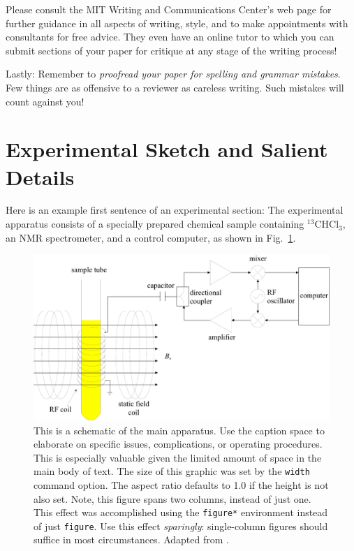 Please consult the MIT Writing and Communications Center's
web page \cite{owc} for further guidance in all aspects of
writing, style, and to make appointments with consultants for free
advice.  They even have an online tutor to which you can submit
sections of your paper for critique at any stage of the writing
process!

Lastly: Remember to \emph{proofread your paper for spelling and grammar
 mistakes}.  Few things are as offensive to a reviewer as careless
 writing. Such mistakes will count against you!

\section{Experimental Sketch and Salient Details}

Here is an example first sentence of an experimental section:
The experimental apparatus consists of a specially prepared chemical
sample containing $^{13}$CHCl$_3$, an NMR spectrometer, and a control
computer, as shown in Fig.~\ref{fig:samplefig}.
%
%
\begin{figure}[htb]
\includegraphics[width=\textwidth]{sample-fig1}
\caption{This is a schematic of the main apparatus.  Use the caption
space to elaborate on specific issues, complications, or operating
procedures.  This is especially valuable given the limited amount of space in
the main body of text.  The size of this graphic was set by the \texttt{width}
command option. The aspect ratio defaults to 1.0 if the height is not also
set. Note, this figure spans two columns, instead of just one. This effect was 
accomplished using the \texttt{figure*} environment instead of just 
\texttt{figure}. Use this effect \emph{sparingly}: single-column figures should suffice in most circumstances. Adapted from \cite{melissinos1966,melissinos2003}.
\label{fig:samplefig}}
\end{figure}

